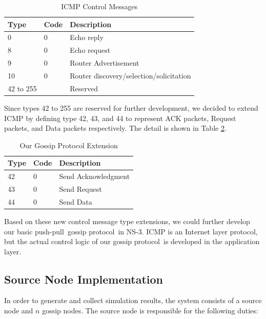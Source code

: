 \documentclass[onehalf,11pt]{beavtex}
\newcommand{\gp}{gossip protocol}
\newcommand{\pp}{push-pull}
\begin{document}
\begin{table}[h]
	\centering
	\caption{ICMP Control Messages}
	\label{table:2}
	\begin{tabular}{|p{1.5cm}|p{0.8 cm}|p{6.5 cm}|}
		\hline
		Type & Code & Description \\                                                           
		\hline
		0  & 0   & Echo reply   \\ \hline
		8  &  0 & Echo request \\ 
		\hline
		9 & 0 & Router Advertisement \\
		\hline
		10	& 0	&	Router discovery/selection/solicitation \\
		\hline
		42 to 255    &   & Reserved    \\ 
		\hline
	\end{tabular}
\end{table}

Since types 42 to 255 are reserved for further development, we decided to extend ICMP by defining type 42, 43, and 44 to represent ACK packets, Request packets, and Data packets respectively. The detail is shown in Table \ref{table:3}.

\begin{table}[h]
	\centering
	\caption{Our Gossip Protocol Extension}
	\label{table:3}
	\begin{tabular}{|p{0.8cm}|p{0.8 cm}|p{4.0 cm}|}
		\hline
		Type & Code & Description \\                                                           
		\hline
		42  & 0   & Send Acknowledgment   \\ \hline
		43  &  0 & Send Request \\ 
		\hline
		44 & 0 & Send Data \\
		\hline
	\end{tabular}
\end{table}

Based on these new control message type extensions, we could further develop our basic \pp  ~\gp ~in NS-3. ICMP is an Internet layer protocol, but the actual control logic of our \gp ~is developed in the application layer. 

\subsection{Source Node Implementation}
In order to generate and collect simulation results, the system consists of a source node and $n$ gossip nodes. The source node is responsible for the following duties:
\end{document}
